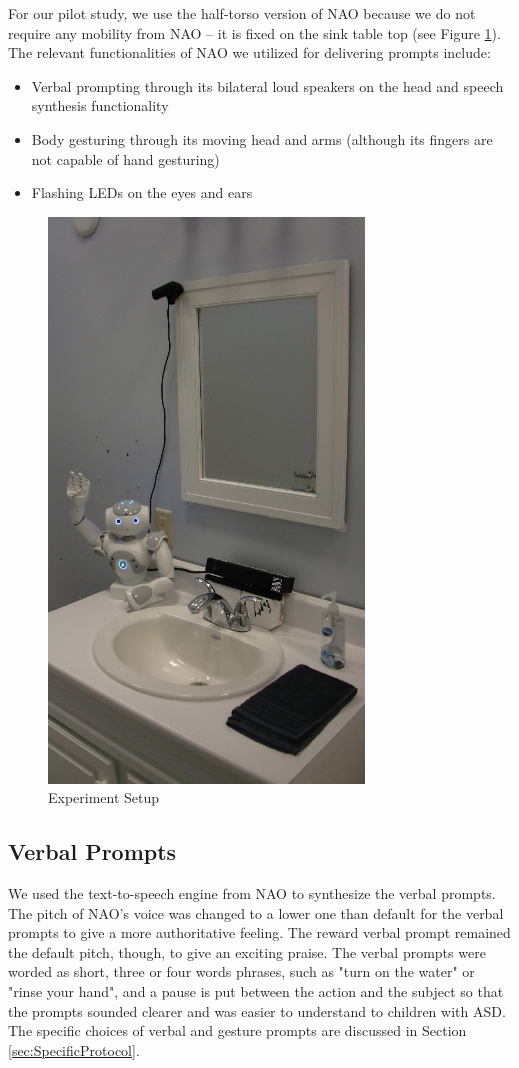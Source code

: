 \documentclass{ut-thesis}
\begin{document}
For our pilot study, we use the half-torso version of NAO because we do not require any mobility from NAO -- it is fixed on the sink table top (see Figure \ref{fig:ExpSetup}).  The relevant functionalities of NAO we utilized for delivering prompts include:
\begin{itemize}
	\item Verbal prompting through its bilateral loud speakers on the head and speech synthesis functionality
	\item Body gesturing through its moving head and arms (although its fingers are not capable of hand gesturing)
	\item Flashing LEDs on the eyes and ears
\end{itemize}
\begin{figure} [h]
	\centering
	\includegraphics[height=15cm, keepaspectratio]{./img/exp_setup.jpg}
	\caption{Experiment Setup}
	\label{fig:ExpSetup}
\end{figure}


\subsection{Verbal Prompts}
We used the text-to-speech engine from NAO to synthesize the verbal prompts.  The pitch of NAO's voice was changed to a lower one than default for the verbal prompts to give a more authoritative feeling.  The reward verbal prompt remained the default pitch, though, to give an exciting praise.  The verbal prompts were worded as short, three or four words phrases, such as "turn on the water" or "rinse your hand", and a pause is put between the action and the subject so that the prompts sounded clearer and was easier to understand to children with ASD.  The specific choices of verbal and gesture prompts are discussed in Section \ref{sec:SpecificProtocol}.
\end{document}
